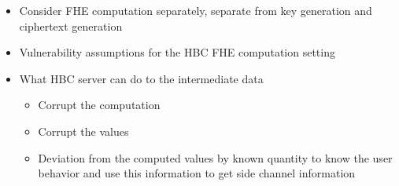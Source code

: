 \begin{itemize}
    \item Consider FHE computation separately, separate from key generation and ciphertext generation
    \item Vulnerability assumptions for the HBC FHE computation setting
    \item What HBC server can do to the intermediate data
          \begin{itemize}
              \item Corrupt the computation
              \item Corrupt the values
              \item Deviation from the computed values by known quantity to know the user behavior and use this information to get side channel information
          \end{itemize}

\end{itemize}
